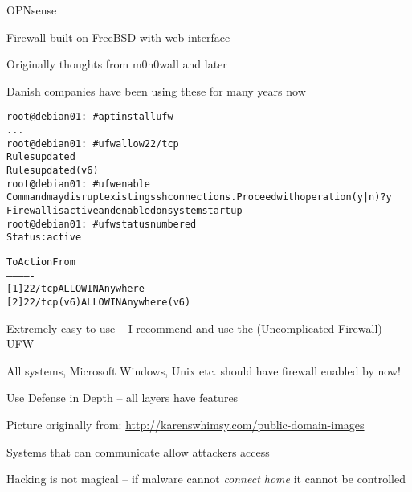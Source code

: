 \documentclass[Screen16to9,17pt]{foils}
\begin{document}
\begin{list1}
\item OPNsense 
\item Firewall built on FreeBSD with web interface
\item Originally thoughts from m0n0wall and later \\
\item Danish companies have been using these for many years now
\end{list1}



\begin{alltt}\small
root@debian01:~# apt install ufw
...
root@debian01:~# ufw allow 22/tcp
Rules updated
Rules updated (v6)
root@debian01:~# ufw enable
Command may disrupt existing ssh connections. Proceed with operation (y|n)? y
Firewall is active and enabled on system startup
root@debian01:~# ufw status numbered
Status: active

     To                         Action      From
     --                         ------      ----
[ 1] 22/tcp                     ALLOW IN    Anywhere
[ 2] 22/tcp (v6)                ALLOW IN    Anywhere (v6)
\end{alltt}

\begin{list2}
\item Extremely easy to use -- I recommend and use the (Uncomplicated Firewall) UFW
\item All systems, Microsoft Windows, Unix etc. should have firewall enabled by now!
\end{list2}



\centerline{Use Defense in Depth -- all layers have features}


\centerline{Picture originally from: \url{http://karenswhimsy.com/public-domain-images}}





Systems that can communicate allow attackers access

Hacking is not magical -- if malware cannot \emph{connect home} it cannot be controlled
\end{document}
